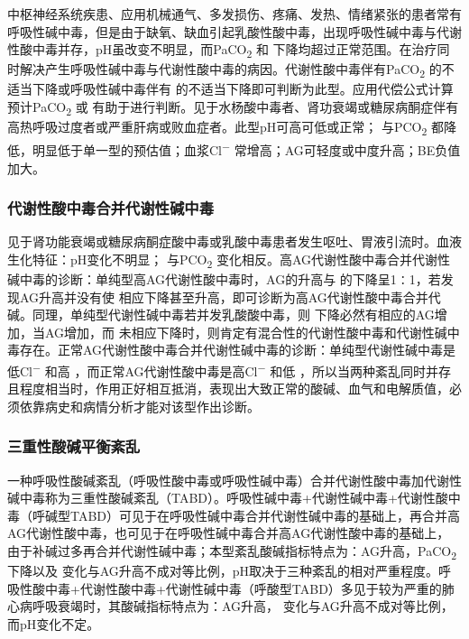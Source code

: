 中枢神经系统疾患、应用机械通气、多发损伤、疼痛、发热、情绪紧张的患者常有呼吸性碱中毒，但是由于缺氧、缺血引起乳酸性酸中毒，出现呼吸性碱中毒与代谢性酸中毒并存，pH虽改变不明显，而PaCO\textsubscript{2}
和{}
下降均超过正常范围。在治疗同时解决产生呼吸性碱中毒与代谢性酸中毒的病因。代谢性酸中毒伴有PaCO\textsubscript{2}
的不适当下降或呼吸性碱中毒伴有{}
的不适当下降即可判断为此型。应用代偿公式计算预计PaCO\textsubscript{2}
或{}
有助于进行判断。见于水杨酸中毒者、肾功衰竭或糖尿病酮症伴有高热呼吸过度者或严重肝病或败血症者。此型pH可高可低或正常；{}
与PCO\textsubscript{2}
都降低，明显低于单一型的预估值；血浆Cl\textsuperscript{−}
常增高；AG可轻度或中度升高；BE负值加大。

\subsubsection{代谢性酸中毒合并代谢性碱中毒}

见于肾功能衰竭或糖尿病酮症酸中毒或乳酸中毒患者发生呕吐、胃液引流时。血液生化特征：pH变化不明显；{}
与PCO\textsubscript{2}
变化相反。高AG代谢性酸中毒合并代谢性碱中毒的诊断：单纯型高AG代谢性酸中毒时，AG的升高与{}
的下降呈1∶1，若发现AG升高并没有使{}
相应下降甚至升高，即可诊断为高AG代谢性酸中毒合并代碱。同理，单纯型代谢性碱中毒若并发乳酸酸中毒，则{}
下降必然有相应的AG增加，当AG增加，而{}
未相应下降时，则肯定有混合性的代谢性酸中毒和代谢性碱中毒存在。正常AG代谢性酸中毒合并代谢性碱中毒的诊断：单纯型代谢性碱中毒是低Cl\textsuperscript{−}
和高{} ，而正常AG代谢性酸中毒是高Cl\textsuperscript{−} 和低{}
，所以当两种紊乱同时并存且程度相当时，作用正好相互抵消，表现出大致正常的酸碱、血气和电解质值，必须依靠病史和病情分析才能对该型作出诊断。

\subsubsection{三重性酸碱平衡紊乱}

一种呼吸性酸碱紊乱（呼吸性酸中毒或呼吸性碱中毒）合并代谢性酸中毒加代谢性碱中毒称为三重性酸碱紊乱（TABD）。呼吸性碱中毒+代谢性碱中毒+代谢性酸中毒（呼碱型TABD）可见于在呼吸性碱中毒合并代谢性碱中毒的基础上，再合并高AG代谢性酸中毒，也可见于在呼吸性碱中毒合并高AG代谢性酸中毒的基础上，由于补碱过多再合并代谢性碱中毒；本型紊乱酸碱指标特点为：AG升高，PaCO\textsubscript{2}
下降以及{}
变化与AG升高不成对等比例，pH取决于三种紊乱的相对严重程度。呼吸性酸中毒+代谢性酸中毒+代谢性碱中毒（呼酸型TABD）多见于较为严重的肺心病呼吸衰竭时，其酸碱指标特点为：AG升高，{}
变化与AG升高不成对等比例，而pH变化不定。

\protect\hypertarget{text00209.html}{}{}

